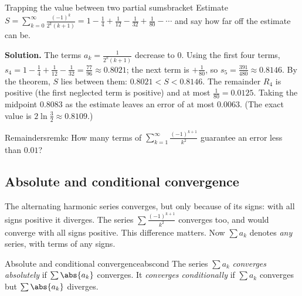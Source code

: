 \documentclass[11pt]{article}
\begin{document}
\begin{exmp}{Trapping the value between two partial sums}{bracket}
Estimate $S=\displaystyle\sum_{k=0}^\infty\frac{(-1)^k}{2^k(k+1)}=1-\frac14+\frac1{12}-\frac1{32}+\frac1{80}-\cdots$ and say how far off the estimate can be.

\textbf{Solution.} The terms $a_k=\frac1{2^k(k+1)}$ decrease to $0$. Using the first four terms, $s_4=1-\frac14+\frac1{12}-\frac1{32}=\frac{77}{96}\approx0.8021$; the next term is $+\frac1{80}$, so $s_5=\frac{391}{480}\approx0.8146$. By the theorem, $S$ lies between them: $0.8021<S<0.8146$. The remainder $R_4$ is positive (the first neglected term is positive) and at most $\frac1{80}=0.0125$. Taking the midpoint $0.8083$ as the estimate leaves an error of at most $0.0063$. (The exact value is $2\ln\frac32\approx0.8109$.)
\end{exmp}

\begin{kc}{Remainders}{remkc}
How many terms of $\displaystyle\sum_{k=1}^\infty\frac{(-1)^{k+1}}{k^2}$ guarantee an error less than $0.01$?
\end{kc}

\subsection*{Absolute and conditional convergence}

The alternating harmonic series converges, but only because of its signs: with all signs positive it diverges. The series $\sum\frac{(-1)^{k+1}}{k^2}$ converges too, and would converge with all signs positive. This difference matters. Now $\sum a_k$ denotes \emph{any} series, with terms of any signs.

\begin{defn}{Absolute and conditional convergence}{abscond}
The series $\sum a_k$ \emph{converges absolutely} if $\sum\abs{a_k}$ converges. It \emph{converges conditionally} if $\sum a_k$ converges but $\sum\abs{a_k}$ diverges.
\end{defn}
\end{document}
